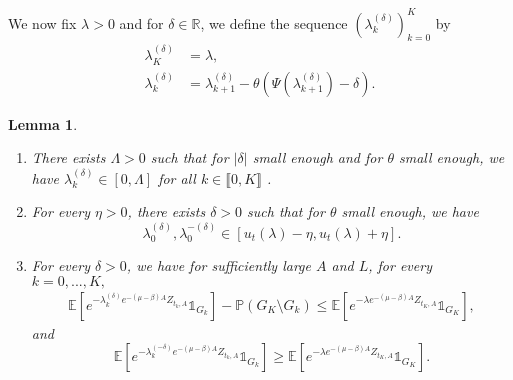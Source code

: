 \documentclass[11pt]{article}
\theoremstyle{plain}
\newtheorem{lemma}{Lemma}[section]
\begin{document}
We now fix $\lambda>0$ and for $\delta\in \mathbb{R}$, we define the sequence $(\lambda_k^{(\delta)})_{k=0}^K$ by
\begin{align*}
\lambda_K^{(\delta )}&=\lambda,\\
\lambda_k^{(\delta)}&= \lambda_{k+1}^{(\delta)}-\theta(\Psi(\lambda_{k+1}^{(\delta)})-\delta).
\end{align*}

\begin{lemma}\label{lem:82}
\begin{enumerate}
\item There exists $\Lambda>0$ such that for $|\delta |$ small enough and for $\theta$ small enough, we have $\lambda_k^{(\delta)}\in[0,\Lambda]$ for all $k\in \llbracket 0, K\rrbracket$ .
\item For every $\eta>0$, there exists $\delta >0$ such that for $\theta$  small enough, we have 
\begin{equation*}
\lambda_0^{(\delta)},\lambda_0^{-(\delta)}\in[u_t(\lambda)-\eta,u_t(\lambda)+\eta].
\end{equation*}
\item For every $\delta >0$, we have for sufficiently large $A$ and $L$, for every $k=0,...,K,$
\begin{eqnarray}
\mathbb{E}\left[e^{-\lambda_k^{(\delta)}e^{-(\mu-\beta)A}Z_{t_k,A}}\mathbb{1}_{G_k}\right]-\mathbb{P}\left(G_K\setminus G_k\right)\leqslant\mathbb{E}\left[e^{-\lambda e^{-(\mu-\beta)A}Z_{t_K,A}}\mathbb{1}_{G_K}\right],
\label{eq:lem82}
\end{eqnarray}
and
\begin{equation}
 \mathbb{E}\left[e^{-\lambda_k^{(-\delta)}e^{-(\mu-\beta)A}Z_{t_k,A}}\mathbb{1}_{G_k}\right]  \geqslant \mathbb{E}\left[e^{-\lambda e^{-(\mu-\beta)A}Z_{t_K,A}}\mathbb{1}_{G_K}\right].
\end{equation}
\end{enumerate}
\end{lemma}
\end{document}
